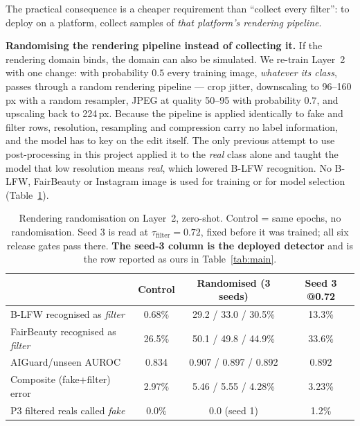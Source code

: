 \documentclass[conference]{IEEEtran}
\begin{document}
The practical consequence is a cheaper requirement than ``collect every filter'': to deploy on
a platform, collect samples of \emph{that platform's rendering pipeline}.

\textbf{Randomising the rendering pipeline instead of collecting it.} If the rendering domain binds,
the domain can also be simulated. We re-train Layer~2 with one change: with probability $0.5$ every
training image, \emph{whatever its class}, passes through a random rendering pipeline --- crop jitter,
downscaling to 96--160\,px with a random resampler, JPEG at quality 50--95 with probability $0.7$, and
upscaling back to 224\,px. Because the pipeline is applied identically to fake and filter rows,
resolution, resampling and compression carry no label information, and the model has to key on the edit
itself. The only previous attempt to use post-processing in this project applied it to the
\emph{real} class alone and taught the model that low resolution means \emph{real}, which lowered B-LFW
recognition. No B-LFW, FairBeauty or Instagram image is used for training or for model selection
(Table~\ref{tab:renderrand}).

\begin{table}[t]
\caption{Rendering randomisation on Layer~2, zero-shot. Control = same epochs, no randomisation. Seed 3
is read at $\tau_{\mathrm{filter}}=0.72$, fixed before it was trained; all six release gates pass there.
\textbf{The seed-3 column is the deployed detector} and is the row reported as ours in
Table~\ref{tab:main}.}
\label{tab:renderrand}
\centering\scriptsize
\begin{tabular}{@{}lccc@{}}
\toprule
 & Control & Randomised (3 seeds) & Seed 3 @0.72 \\
\midrule
B-LFW recognised as \emph{filter} & 0.68\% & 29.2 / 33.0 / 30.5\% & 13.3\% \\
FairBeauty recognised as \emph{filter} & 26.5\% & 50.1 / 49.8 / 44.9\% & 33.6\% \\
AIGuard/unseen AUROC & 0.834 & 0.907 / 0.897 / 0.892 & 0.892 \\
Composite (fake+filter) error & 2.97\% & 5.46 / 5.55 / 4.28\% & 3.23\% \\
P3 filtered reals called \emph{fake} & 0.0\% & 0.0 (seed 1) & 1.2\% \\
\bottomrule
\end{tabular}
\end{table}
\end{document}
